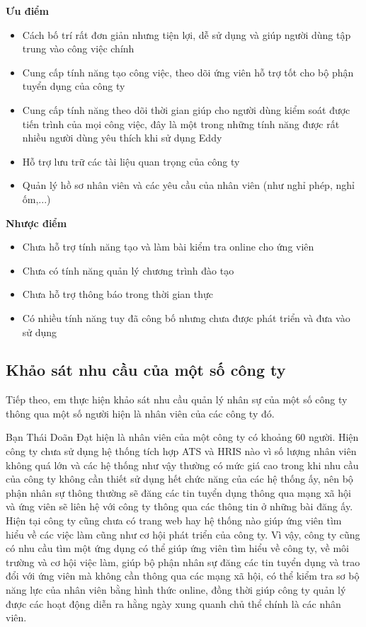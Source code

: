 \documentclass[../DoAn.tex]{subfiles}
\begin{document}
\textbf{Ưu điểm}
\begin{itemize}
    \item Cách bố trí rất đơn giản nhưng tiện lợi, dễ sử dụng và giúp người dùng tập trung vào công việc chính
    \item Cung cấp tính năng tạo công việc, theo dõi ứng viên hỗ trợ tốt cho bộ phận tuyển dụng của công ty
    \item Cung cấp tính năng theo dõi thời gian giúp cho người dùng kiểm soát được tiến trình của mọi công việc, đây là một trong những tính năng được rất nhiều người dùng yêu thích khi sử dụng Eddy
    \item Hỗ trợ lưu trữ các tài liệu quan trọng của công ty
    \item Quản lý hồ sơ nhân viên và các yêu cầu của nhân viên (như nghỉ phép, nghỉ ốm,...)
\end{itemize}

\textbf{Nhược điểm}
\begin{itemize}
    \item Chưa hỗ trợ tính năng tạo và làm bài kiểm tra online cho ứng viên
     \item Chưa có tính năng quản lý chương trình đào tạo
    \item Chưa hỗ trợ thông báo trong thời gian thực
    \item Có nhiều tính năng tuy đã công bố nhưng chưa được phát triển và đưa vào sử dụng
\end{itemize}

\subsection{Khảo sát nhu cầu của một số công ty}
Tiếp theo, em thực hiện khảo sát nhu cầu quản lý nhân sự của một số công ty thông qua một số người hiện là nhân viên của các công ty đó.

Bạn Thái Doãn Đạt hiện là nhân viên của một công ty có khoảng 60 người. Hiện công ty chưa sử dụng hệ thống tích hợp ATS và HRIS nào vì số lượng nhân viên không quá lớn và các hệ thống như vậy thường có mức giá cao trong khi nhu cầu của công ty không cần thiết sử dụng hết chức năng của các hệ thống ấy, nên bộ phận nhân sự thông thường sẽ đăng các tin tuyển dụng thông qua mạng xã hội và ứng viên sẽ liên hệ với công ty thông qua các thông tin ở những bài đăng ấy. Hiện tại công ty cũng chưa có trang web hay hệ thống nào giúp ứng viên tìm hiểu về các việc làm cũng như cơ hội phát triển của công ty. Vì vậy, công ty cũng có nhu cầu tìm một ứng dụng có thể giúp ứng viên tìm hiểu về công ty, về môi trường và cơ hội việc làm, giúp bộ phận nhân sự đăng các tin tuyển dụng và trao đổi với ứng viên mà không cần thông qua các mạng xã hội, có thể kiểm tra sơ bộ năng lực của nhân viên bằng hình thức online, đồng thời giúp công ty quản lý được các hoạt động diễn ra hằng ngày xung quanh chủ thể chính là các nhân viên. 
\end{document}
